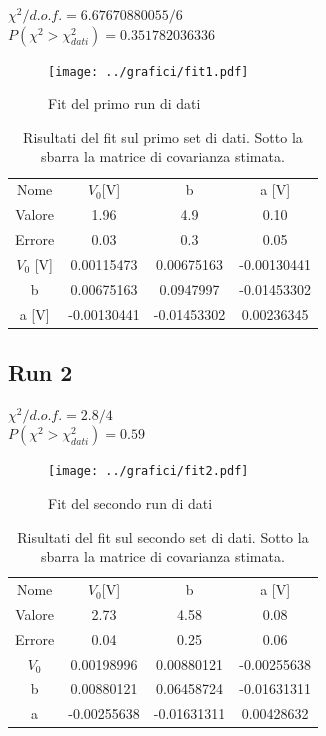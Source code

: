 \documentclass[a4paper,10pt]{article}
\begin{document}
$\chi^2/d.o.f.=6.67670880055/6$ \\
$P(\chi^2>\chi^2_{dati})=0.351782036336$\\ 

\begin{figure}[H]
	\centering
	\texttt{[image: ../grafici/fit1.pdf]}
	\caption{Fit del primo run di dati}
	\label{fig:RUN1}
\end{figure}

\begin{table}[H]
	\centering
	\begin{tabular}{cccc}
	Nome	&	$ V_0 $[V] &  b          & a [V]\\
	Valore  & 1.96   & 4.9  & 0.10\\ 
	Errore  & 0.03 & 0.3 & 0.05\\
	\hline
	$V_0$ [V] & 0.00115473  & 0.00675163  & -0.00130441\\
	b  	    & 0.00675163  & 0.0947997   & -0.01453302\\
	a [V]   & -0.00130441 & -0.01453302 & 0.00236345\\
\end{tabular}
\caption{Risultati del fit sul primo set di dati. Sotto la sbarra la matrice di covarianza stimata.}
\label{tab:Run1}
\end{table}

\subsection{Run 2}

$\chi^2/d.o.f.= 2.8/4$ \\
$P(\chi^2>\chi^2_{dati})= 0.59$\\
 
\begin{figure}[H]
	\centering
	\texttt{[image: ../grafici/fit2.pdf]}
	\caption{Fit del secondo run di dati}
	\label{fig:RUN2}
\end{figure} 

\begin{table}[H]
	\centering
	\begin{tabular}{cccc}
	Nome	&	$ V_0 $[V] &  b      & a [V]\\
	Valore  &   2.73 & 4.58  & 0.08\\
	Errore	& 0.04   & 0.25  & 0.06\\ 
\hline 
	$V_0$ & 0.00198996 & 0.00880121  &-0.00255638\\
 	b     & 0.00880121 & 0.06458724  &-0.01631311\\
 	a     &-0.00255638 & -0.01631311 & 0.00428632\\
\end{tabular}
\caption{Risultati del fit sul secondo set di dati. Sotto la sbarra la matrice di covarianza stimata.}
\label{tab:Run2}
\end{table}
\end{document}
